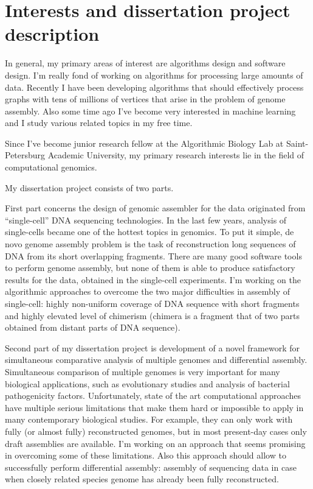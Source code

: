 \section{Interests and dissertation project description}
\blankline
In general, my primary areas of interest are algorithms design and software design. 
\blankline
I'm really fond of working on algorithms for processing large amounts of data.
Recently I have been developing algorithms that should effectively process graphs with tens of millions of vertices that arise in the problem of genome assembly.
\blankline
Also some time ago I've become very interested in machine learning and I study various related topics in my free time.

\blankline
Since I've become junior research fellow at the Algorithmic Biology Lab at Saint-Petersburg Academic University, my primary research interests lie in the field of computational genomics. 

My dissertation project consists of two parts. 

\blankline
First part concerns the design of genomic assembler for the data originated from ``single-cell'' DNA sequencing technologies. 
In the last few years, analysis of single-cells became one of the hottest topics in genomics.
To put it simple, de novo genome assembly problem is the task of reconstruction long sequences of DNA from its short overlapping fragments. 
There are many good software tools to perform genome assembly, but none of them is able to produce satisfactory results for the data, obtained in the single-cell experiments. 
I'm working on the algorithmic approaches to overcome the two major difficulties in assembly of single-cell: 
highly non-uniform coverage of DNA sequence with short fragments and highly elevated level of chimerism (chimera is a fragment that  of two parts obtained from distant parts of DNA sequence).

\blankline
Second part of my dissertation project is development of a novel framework for simultaneous comparative analysis of multiple genomes and differential assembly.
Simultaneous comparison of multiple genomes is very important for many biological applications, such as evolutionary studies and analysis of bacterial pathogenicity factors. 
Unfortunately, state of the art computational approaches have multiple serious limitations that make them hard or impossible to apply in many contemporary biological studies.
For example, they can only work with fully (or almost fully) reconstructed genomes, but in most present-day cases only draft assemblies are available.
I'm working on an approach that seems promising in overcoming some of these limitations.
Also this approach should allow to successfully perform differential assembly: assembly of sequencing data in case when closely related species genome has already been fully reconstructed.
